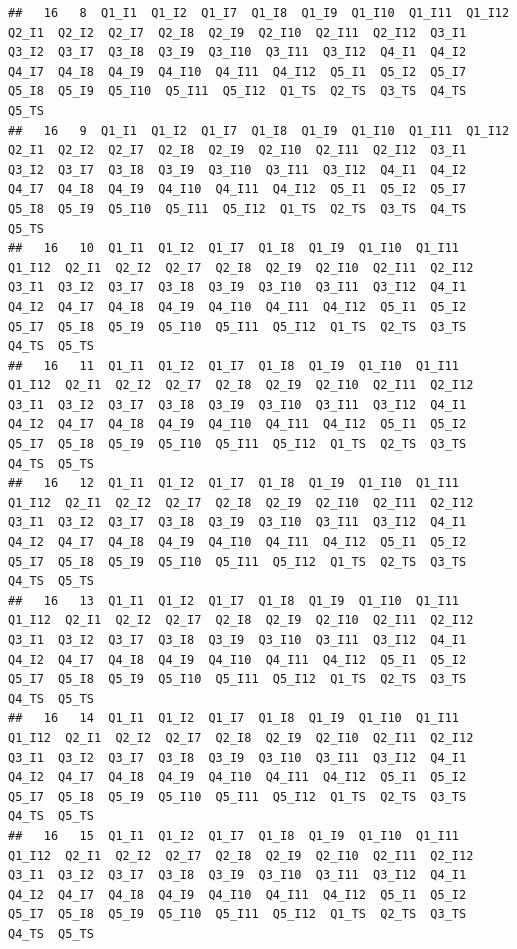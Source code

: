 \documentclass[]{book}
\begin{document}
\begin{verbatim}
##   16   8  Q1_I1  Q1_I2  Q1_I7  Q1_I8  Q1_I9  Q1_I10  Q1_I11  Q1_I12  Q2_I1  Q2_I2  Q2_I7  Q2_I8  Q2_I9  Q2_I10  Q2_I11  Q2_I12  Q3_I1  Q3_I2  Q3_I7  Q3_I8  Q3_I9  Q3_I10  Q3_I11  Q3_I12  Q4_I1  Q4_I2  Q4_I7  Q4_I8  Q4_I9  Q4_I10  Q4_I11  Q4_I12  Q5_I1  Q5_I2  Q5_I7  Q5_I8  Q5_I9  Q5_I10  Q5_I11  Q5_I12  Q1_TS  Q2_TS  Q3_TS  Q4_TS  Q5_TS
##   16   9  Q1_I1  Q1_I2  Q1_I7  Q1_I8  Q1_I9  Q1_I10  Q1_I11  Q1_I12  Q2_I1  Q2_I2  Q2_I7  Q2_I8  Q2_I9  Q2_I10  Q2_I11  Q2_I12  Q3_I1  Q3_I2  Q3_I7  Q3_I8  Q3_I9  Q3_I10  Q3_I11  Q3_I12  Q4_I1  Q4_I2  Q4_I7  Q4_I8  Q4_I9  Q4_I10  Q4_I11  Q4_I12  Q5_I1  Q5_I2  Q5_I7  Q5_I8  Q5_I9  Q5_I10  Q5_I11  Q5_I12  Q1_TS  Q2_TS  Q3_TS  Q4_TS  Q5_TS
##   16   10  Q1_I1  Q1_I2  Q1_I7  Q1_I8  Q1_I9  Q1_I10  Q1_I11  Q1_I12  Q2_I1  Q2_I2  Q2_I7  Q2_I8  Q2_I9  Q2_I10  Q2_I11  Q2_I12  Q3_I1  Q3_I2  Q3_I7  Q3_I8  Q3_I9  Q3_I10  Q3_I11  Q3_I12  Q4_I1  Q4_I2  Q4_I7  Q4_I8  Q4_I9  Q4_I10  Q4_I11  Q4_I12  Q5_I1  Q5_I2  Q5_I7  Q5_I8  Q5_I9  Q5_I10  Q5_I11  Q5_I12  Q1_TS  Q2_TS  Q3_TS  Q4_TS  Q5_TS
##   16   11  Q1_I1  Q1_I2  Q1_I7  Q1_I8  Q1_I9  Q1_I10  Q1_I11  Q1_I12  Q2_I1  Q2_I2  Q2_I7  Q2_I8  Q2_I9  Q2_I10  Q2_I11  Q2_I12  Q3_I1  Q3_I2  Q3_I7  Q3_I8  Q3_I9  Q3_I10  Q3_I11  Q3_I12  Q4_I1  Q4_I2  Q4_I7  Q4_I8  Q4_I9  Q4_I10  Q4_I11  Q4_I12  Q5_I1  Q5_I2  Q5_I7  Q5_I8  Q5_I9  Q5_I10  Q5_I11  Q5_I12  Q1_TS  Q2_TS  Q3_TS  Q4_TS  Q5_TS
##   16   12  Q1_I1  Q1_I2  Q1_I7  Q1_I8  Q1_I9  Q1_I10  Q1_I11  Q1_I12  Q2_I1  Q2_I2  Q2_I7  Q2_I8  Q2_I9  Q2_I10  Q2_I11  Q2_I12  Q3_I1  Q3_I2  Q3_I7  Q3_I8  Q3_I9  Q3_I10  Q3_I11  Q3_I12  Q4_I1  Q4_I2  Q4_I7  Q4_I8  Q4_I9  Q4_I10  Q4_I11  Q4_I12  Q5_I1  Q5_I2  Q5_I7  Q5_I8  Q5_I9  Q5_I10  Q5_I11  Q5_I12  Q1_TS  Q2_TS  Q3_TS  Q4_TS  Q5_TS
##   16   13  Q1_I1  Q1_I2  Q1_I7  Q1_I8  Q1_I9  Q1_I10  Q1_I11  Q1_I12  Q2_I1  Q2_I2  Q2_I7  Q2_I8  Q2_I9  Q2_I10  Q2_I11  Q2_I12  Q3_I1  Q3_I2  Q3_I7  Q3_I8  Q3_I9  Q3_I10  Q3_I11  Q3_I12  Q4_I1  Q4_I2  Q4_I7  Q4_I8  Q4_I9  Q4_I10  Q4_I11  Q4_I12  Q5_I1  Q5_I2  Q5_I7  Q5_I8  Q5_I9  Q5_I10  Q5_I11  Q5_I12  Q1_TS  Q2_TS  Q3_TS  Q4_TS  Q5_TS
##   16   14  Q1_I1  Q1_I2  Q1_I7  Q1_I8  Q1_I9  Q1_I10  Q1_I11  Q1_I12  Q2_I1  Q2_I2  Q2_I7  Q2_I8  Q2_I9  Q2_I10  Q2_I11  Q2_I12  Q3_I1  Q3_I2  Q3_I7  Q3_I8  Q3_I9  Q3_I10  Q3_I11  Q3_I12  Q4_I1  Q4_I2  Q4_I7  Q4_I8  Q4_I9  Q4_I10  Q4_I11  Q4_I12  Q5_I1  Q5_I2  Q5_I7  Q5_I8  Q5_I9  Q5_I10  Q5_I11  Q5_I12  Q1_TS  Q2_TS  Q3_TS  Q4_TS  Q5_TS
##   16   15  Q1_I1  Q1_I2  Q1_I7  Q1_I8  Q1_I9  Q1_I10  Q1_I11  Q1_I12  Q2_I1  Q2_I2  Q2_I7  Q2_I8  Q2_I9  Q2_I10  Q2_I11  Q2_I12  Q3_I1  Q3_I2  Q3_I7  Q3_I8  Q3_I9  Q3_I10  Q3_I11  Q3_I12  Q4_I1  Q4_I2  Q4_I7  Q4_I8  Q4_I9  Q4_I10  Q4_I11  Q4_I12  Q5_I1  Q5_I2  Q5_I7  Q5_I8  Q5_I9  Q5_I10  Q5_I11  Q5_I12  Q1_TS  Q2_TS  Q3_TS  Q4_TS  Q5_TS

\end{verbatim}
\end{document}
